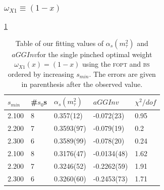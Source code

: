 \documentclass[../../index.tex]{subfiles}
\begin{document}
\subsubsection{\(\omega_{X1} \equiv (1-x)\)}
\cref{table:fitOpt10AlD4}
\begin{table}
  \centering
  \begin{tabular}{lllll}
    \toprule
    \(s_{min}\) & \#\(s_0\)s & \(\alpha_s(m_\tau^2)\) & \(aGGInv\) & \(\chi^2/dof\)  \\
    \midrule
    2.100 & 8  & 0.357(12) & -0.072(23) & 0.95 \\
    2.200 & 7  & 0.3593(97) & -0.079(19) & 0.2 \\
    2.300 & 6  & 0.3589(99) & -0.078(20) & 0.24 \\
    \midrule     
    2.100 & 8 & 0.3176(47) & -0.0134(48) & 1.62 \\
    2.200 & 7 & 0.3246(52) & -0.2262(59) & 1.91 \\
    2.300 & 6 & 0.3260(60) & -0.2453(73) & 1.71 \\
    \bottomrule
  \end{tabular}
  \caption{Table of our fitting values of \(\alpha_s(m_\tau^2)\) and
    \(aGGInv\)for the single pinched optimal weight \(\omega_{X1}(x)=(1-x)\)
    using the \textsc{fopt} and \textsc{bs} ordered by increasing \(s_{min}\).
    The errors are given in parenthesis after the observed value.}
  \label{table:fitOpt10AlD4}
\end{table}
\end{document}
